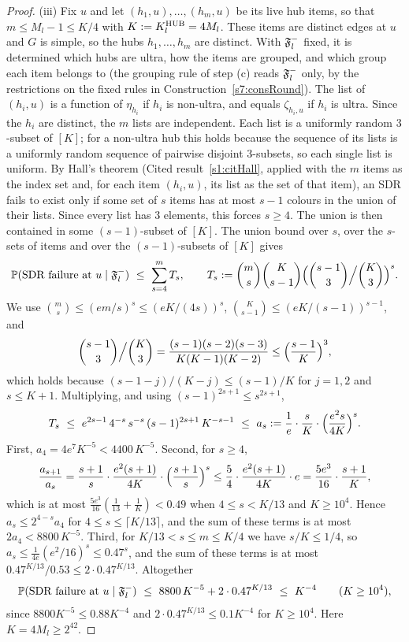 \begin{proof}
(iii) Fix $u$ and let $(h_1,u),\dots,(h_m,u)$ be its live hub items, so that
$m\le M_l-1\le K/4$ with $K\mathrel{:=}K^{\mathrm{HUB}}_l=4M_l$. These items are distinct edges at
$u$ and $G$ is simple, so the hubs $h_1,\dots,h_m$ are distinct. With $\mathfrak{F}^{-}_l$
fixed, it is determined which hubs are ultra, how the items are grouped, and
which group each item belongs to (the grouping rule of step (c) reads $\mathfrak{F}^{-}_l$
only, by the restrictions on the fixed rules in
Construction~\ref{s7:consRound}). The list of $(h_i,u)$ is a function of
$\eta_{h_i}$ if $h_i$ is non-ultra, and equals $\zeta_{h_i,u}$ if $h_i$ is ultra.
Since the $h_i$ are distinct, the $m$ lists are independent. Each list is a
uniformly random $3$-subset of $[K]$; for a non-ultra hub this holds because the
sequence of its lists is a uniformly random sequence of pairwise disjoint
$3$-subsets, so each single list is uniform. By Hall's theorem (Cited
result~\ref{s1:citHall}, applied with the $m$ items as the index set and, for
each item $(h_i,u)$, its list as the set of that item), an SDR fails to exist
only if some set of $s$ items has at most $s-1$ colours in the union of their
lists. Since every list has $3$ elements, this forces $s\ge4$. The union is
then contained in some $(s-1)$-subset of $[K]$. The union bound over $s$, over
the $s$-sets of items and over the $(s-1)$-subsets of $[K]$ gives
\[
\mathbb{P}(\text{SDR failure at }u\mid\mathfrak{F}^{-}_l)\ \le\ \sum_{s=4}^{m}T_s,\qquad
T_s\mathrel{:=}\binom{m}{s}\binom{K}{s-1}\Bigl(\binom{s-1}{3}\Big/\binom{K}{3}\Bigr)^{s}.
\]
We use $\binom{m}{s}\le(em/s)^s\le(eK/(4s))^s$,
$\binom{K}{s-1}\le(eK/(s-1))^{s-1}$, and
\[
\binom{s-1}{3}\Big/\binom{K}{3}=\frac{(s-1)(s-2)(s-3)}{K(K-1)(K-2)}\le\Bigl(\frac{s-1}{K}\Bigr)^3 ,
\]
which holds because $(s-1-j)/(K-j)\le(s-1)/K$ for $j=1,2$ and $s\le K+1$.
Multiplying, and using $(s-1)^{2s+1}\le s^{2s+1}$,
\[
T_s\ \le\ e^{2s-1}\,4^{-s}\,s^{-s}\,(s-1)^{2s+1}\,K^{-s-1}\ \le\
a_s\defeq\frac1e\cdot\frac sK\cdot\Bigl(\frac{e^2s}{4K}\Bigr)^{s}.
\]
First, $a_4=4e^7K^{-5}<4400\,K^{-5}$. Second, for $s\ge4$,
\[
\frac{a_{s+1}}{a_s}=\frac{s+1}{s}\cdot\frac{e^2(s+1)}{4K}\cdot\Bigl(\frac{s+1}{s}\Bigr)^{s}
\le\frac54\cdot\frac{e^2(s+1)}{4K}\cdot e=\frac{5e^3}{16}\cdot\frac{s+1}{K},
\]
which is at most $\frac{5e^3}{16}(\frac1{13}+\frac1K)<0.49$ when $4\le s<K/13$ and
$K\ge10^4$. Hence $a_s\le2^{4-s}a_4$ for $4\le s\le\lceil K/13\rceil$, and the sum
of these terms is at most $2a_4<8800\,K^{-5}$. Third, for $K/13<s\le m\le K/4$ we
have $s/K\le1/4$, so $a_s\le\frac1{4e}(e^2/16)^s\le0.47^{s}$, and the sum of
these terms is at most $0.47^{K/13}/0.53\le2\cdot0.47^{K/13}$. Altogether
\[
\mathbb{P}(\text{SDR failure at }u\mid\mathfrak{F}^{-}_l)\ \le\ 8800\,K^{-5}+2\cdot0.47^{K/13}\ \le\ K^{-4}
\qquad(K\ge10^4),
\]
since $8800K^{-5}\le0.88K^{-4}$ and $2\cdot0.47^{K/13}\le0.1K^{-4}$ for
$K\ge10^4$. Here $K=4M_l\ge2^{42}$.


\end{proof}

